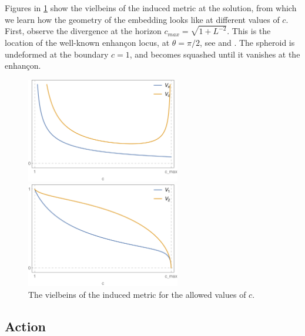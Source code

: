 Figures in \ref{fig:vielbeins} show the vielbeins of the induced metric at the solution, from which we learn how the geometry of the embedding looks like at different values of $c$. First, observe the divergence at the horizon $c_{max}=\sqrt{1+L^{-2}}$. This is the location of the well-known enhançon locus, at $\theta = \pi/2$, see \cite{Buchel:2000cn} and \cite{Evans:2000ct}. The spheroid is undeformed at the boundary $c=1$, and becomes squashed until it vanishes at the enhançon. 

\begin{figure}[t!]
\begin{center}
\includegraphics[width=0.6\textwidth]{pictures/vxvcb.png}
\end{center}
\vspace{0.05mm}
\begin{center}
\includegraphics[width=0.6\textwidth]{pictures/v1v2b.png}
\end{center}
\caption{\label{fig:vielbeins} The vielbeins of the induced metric for the allowed values of $c$.}
\end{figure}



\subsection{Action}


